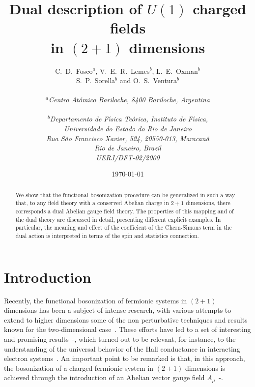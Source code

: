 \documentclass[a4paper,12pt]{article}
\begin{document}
\title{Dual description of $U(1)$ charged fields\\in $(2+1)$
  dimensions}
\author{C.~D.~Fosco$^a$, V.~E.~R.~Lemes$^b$, L.~E.~Oxman$^b$\\
  S.~P.~Sorella$^b$ and O.~S.~Ventura$^b$\\ \\
  {\normalsize\it $^a$Centro At\' omico Bariloche, 8400 Bariloche,
    Argentina}\\ \\
  {\normalsize\it $^b$Departamento de F\'{\i}sica Te\'{o}rica, Instituto de F\'{\i}sica,}\\
  {\normalsize\it Universidade do Estado do Rio de Janeiro}\\
  {\normalsize\it Rua S{\~a}o Francisco Xavier, 524, 20550-013, Maracan\~{a}}\\
  {\normalsize\it Rio de Janeiro, Brazil}\\
  {\normalsize\it UERJ/DFT-02/2000} }
\date{\today}
\maketitle
\begin{abstract}
  We show that the functional bosonization procedure can be
  generalized in such a way that, to any field theory with a conserved
  Abelian charge in $2+1$ dimensions, there corresponds a dual Abelian
  gauge field theory.  The properties of this mapping and of the dual
  theory are discussed in detail, presenting different explicit
  examples. In particular, the meaning and effect of the coefficient
  of the Chern-Simons term in the dual action is interpreted in terms
  of the spin and statistics connection.
\end{abstract}
\bigskip {}
\section{Introduction}
Recently, the functional bosonization of fermionic systems in $(2+1)$
dimensions has been a subject of intense research, with various
attempts to extend to higher dimensions some of the non perturbative
techniques and results known for the two-dimensional case~\cite{2b}.
These efforts have led to a set of interesting and promising
results~\cite{result1}-\cite{result6}, which turned out to be
relevant, for instance, to the understanding of the universal behavior
of the Hall conductance in interacting electron systems~\cite{bo}. An
important point to be remarked is that, in this approach, the
bosonization of a charged fermionic system in \mbox{$(2+1)$}
dimensions is achieved through the introduction of an Abelian vector
gauge field $A_\mu$~\cite{result1}-\cite{result7}.
\end{document}
